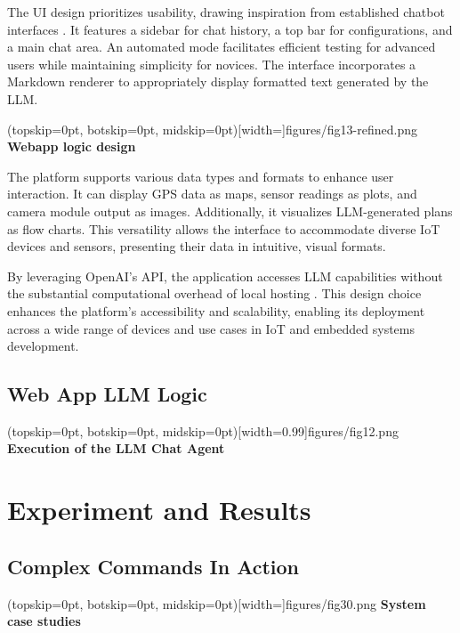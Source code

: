 \documentclass{ieeeaccess}
\begin{document}
The UI design prioritizes usability, drawing inspiration from established chatbot interfaces \cite{OpenAI_GPT}. It features a sidebar for chat history, a top bar for configurations, and a main chat area. An automated mode facilitates efficient testing for advanced users while maintaining simplicity for novices. The interface incorporates a Markdown renderer to appropriately display formatted text generated by the LLM.

\Figure[t!](topskip=0pt, botskip=0pt,
midskip=0pt)[width=\textwidth]{{figures/fig13-refined.png}}
{ \textbf{Webapp logic design}\label{fig5}}

The platform supports various data types and formats to enhance user interaction. It can display GPS data as maps, sensor readings as plots, and camera module output as images. Additionally, it visualizes LLM-generated plans as flow charts. This versatility allows the interface to accommodate diverse IoT devices and sensors, presenting their data in intuitive, visual formats.

By leveraging OpenAI's API, the application accesses LLM capabilities without the substantial computational overhead of local hosting \cite{kim2024llmemestimatinggpumemory}. This design choice enhances the platform's accessibility and scalability, enabling its deployment across a wide range of devices and use cases in IoT and embedded systems development.


\subsection{Web App LLM Logic}

\Figure[b!](topskip=0pt, botskip=0pt,
midskip=0pt)[width=0.99\columnwidth]{{figures/fig12.png}}
{ \textbf{Execution of the LLM Chat Agent}\label{fig6}}




\section{Experiment and Results}
\label{sec:experiment}

\subsection{Complex Commands In Action}
\Figure[t!](topskip=0pt, botskip=0pt,
midskip=0pt)[width=\textwidth]{{figures/fig30.png}}
{ \textbf{System case studies}\label{fig6}}
\end{document}
